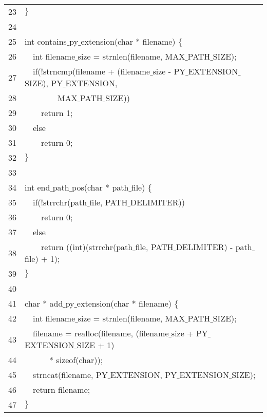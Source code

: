 \documentclass{report}
\newcommand{\tab}{$\quad$}
\newcommand{\csfont}[1]{\fontfamily{cmtt}\selectfont #1}
\begin{document}
\begin{tabular}{c|l}
  23 & {\csfont{$\}$}} \\
  24 & {\csfont{}} \\
  25 & {\csfont{int contains$\_$py$\_$extension(char * filename) $\{$}} \\
  26 & {\csfont{\tab int filename$\_$size = strnlen(filename, MAX$\_$PATH$\_$SIZE);}} \\
  27 & {\csfont{\tab if(!strncmp(filename + (filename$\_$size - PY$\_$EXTENSION$\_$SIZE), PY$\_$EXTENSION,}} \\
  28 & {\csfont{\tab \tab \tab \tab MAX$\_$PATH$\_$SIZE))}} \\
  29 & {\csfont{\tab \tab return 1;}} \\
  30 & {\csfont{\tab else}} \\
  31 & {\csfont{\tab \tab return 0;}} \\
  32 & {\csfont{$\}$}} \\
  33 & {\csfont{}} \\
  34 & {\csfont{int end$\_$path$\_$pos(char * path$\_$file) $\{$}} \\
  35 & {\csfont{\tab if(!strrchr(path$\_$file, PATH$\_$DELIMITER))}} \\
  36 & {\csfont{\tab \tab return 0;}} \\
  37 & {\csfont{\tab else}} \\
  38 & {\csfont{\tab \tab return ((int)(strrchr(path$\_$file, PATH$\_$DELIMITER) - path$\_$file) + 1);}} \\
  39 & {\csfont{$\}$}} \\
  40 & {\csfont{}} \\
  41 & {\csfont{char * add$\_$py$\_$extension(char * filename) $\{$}} \\
  42 & {\csfont{\tab int filename$\_$size = strnlen(filename, MAX$\_$PATH$\_$SIZE);}} \\
  43 & {\csfont{\tab filename = realloc(filename, (filename$\_$size + PY$\_$EXTENSION$\_$SIZE + 1)}} \\
  44 & {\csfont{\tab \tab \tab * sizeof(char));}} \\
  45 & {\csfont{\tab strncat(filename, PY$\_$EXTENSION, PY$\_$EXTENSION$\_$SIZE);}} \\
  46 & {\csfont{\tab return filename;}} \\
  47 & {\csfont{$\}$}} \\
\end{tabular}
\end{document}
